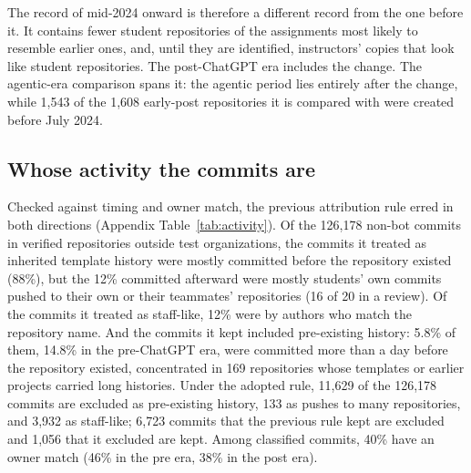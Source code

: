 \documentclass[acmsmall,screen,review,anonymous]{acmart}
\begin{document}
The record of mid-2024 onward is therefore a different record from the one before it. It contains fewer student repositories of the assignments most likely to resemble earlier ones, and, until they are identified, instructors' copies that look like student repositories. The post-ChatGPT era includes the change. The agentic-era comparison spans it: the agentic period lies entirely after the change, while 1,543 of the 1,608 early-post repositories it is compared with were created before July 2024.

\subsection{Whose activity the commits are}
\label{sec:whose}

Checked against timing and owner match, the previous attribution rule erred in both directions (Appendix Table~\ref{tab:activity}). Of the 126,178 non-bot commits in verified repositories outside test organizations, the commits it treated as inherited template history were mostly committed before the repository existed (88\%), but the 12\% committed afterward were mostly students' own commits pushed to their own or their teammates' repositories (16 of 20 in a review). Of the commits it treated as staff-like, 12\% were by authors who match the repository name. And the commits it kept included pre-existing history: 5.8\% of them, 14.8\% in the pre-ChatGPT era, were committed more than a day before the repository existed, concentrated in 169 repositories whose templates or earlier projects carried long histories. Under the adopted rule, 11,629 of the 126,178 commits are excluded as pre-existing history, 133 as pushes to many repositories, and 3,932 as staff-like; 6,723 commits that the previous rule kept are excluded and 1,056 that it excluded are kept. Among classified commits, 40\% have an owner match (46\% in the pre era, 38\% in the post era).
\end{document}
